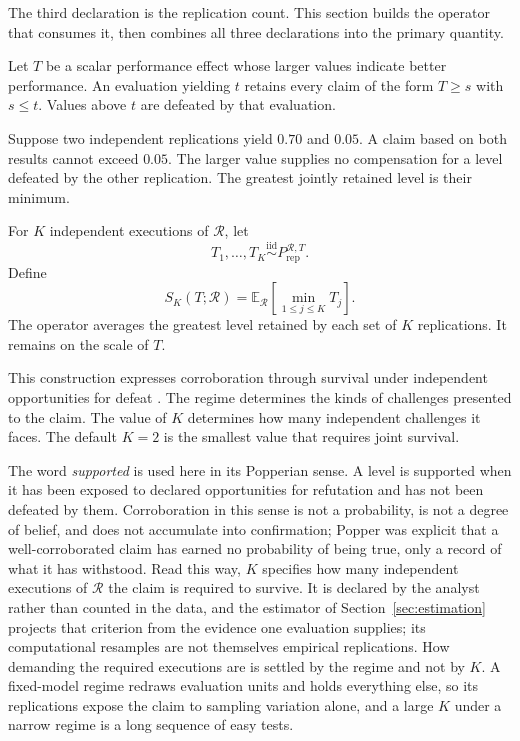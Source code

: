 \documentclass[11pt]{article}
\newcommand{\Regime}{\mathcal{R}}
\newcommand{\E}{\mathbb{E}}
\newcommand{\iid}{\mathrel{\overset{\mathrm{iid}}{\sim}}}
\theoremstyle{remark}
\begin{document}
The third declaration is the replication count. This section builds the operator that consumes it, then combines all three declarations into the primary quantity.

Let $T$ be a scalar performance effect whose larger values indicate better performance. An evaluation yielding $t$ retains every claim of the form $T\geq s$ with $s\leq t$. Values above $t$ are defeated by that evaluation.

Suppose two independent replications yield $0.70$ and $0.05$. A claim based on both results cannot exceed $0.05$. The larger value supplies no compensation for a level defeated by the other replication. The greatest jointly retained level is their minimum.

For $K$ independent executions of $\Regime$, let
\[
T_1,\ldots,T_K
\iid
P_{\mathrm{rep}}^{\Regime,T}.
\]
Define
\begin{equation}
S_K(T;\Regime)
=
\E_{\Regime}
\left[
\min_{1\leq j\leq K}T_j
\right].
\label{eq:support-operator}
\end{equation}
The operator averages the greatest level retained by each set of $K$ replications. It remains on the scale of $T$.

This construction expresses corroboration through survival under independent opportunities for defeat \cite{popper1959logic}. The regime determines the kinds of challenges presented to the claim. The value of $K$ determines how many independent challenges it faces. The default $K=2$ is the smallest value that requires joint survival.

The word \emph{supported} is used here in its Popperian sense. A level is supported when it has been exposed to declared opportunities for refutation and has not been defeated by them. Corroboration in this sense is not a probability, is not a degree of belief, and does not accumulate into confirmation; Popper was explicit that a well-corroborated claim has earned no probability of being true, only a record of what it has withstood. Read this way, $K$ specifies how many independent executions of $\Regime$ the claim is required to survive. It is declared by the analyst rather than counted in the data, and the estimator of Section~\ref{sec:estimation} projects that criterion from the evidence one evaluation supplies; its computational resamples are not themselves empirical replications. How demanding the required executions are is settled by the regime and not by $K$. A fixed-model regime redraws evaluation units and holds everything else, so its replications expose the claim to sampling variation alone, and a large $K$ under a narrow regime is a long sequence of easy tests.
\end{document}
